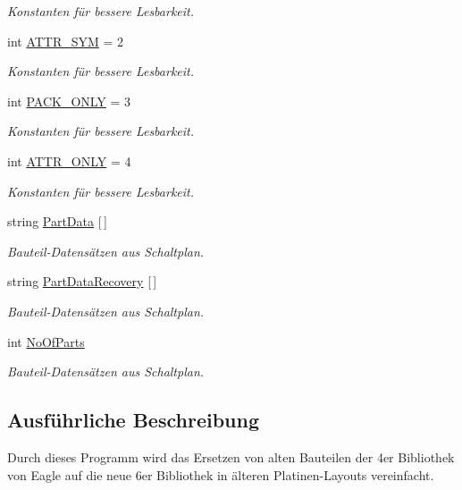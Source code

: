 \begin{DoxyCompactItemize}
\begin{DoxyCompactList}\small\item\em Konstanten für bessere Lesbarkeit. \end{DoxyCompactList}\item 
int \hyperlink{_platzhalter_ersetzen_8ulp_a13a376a84d960a74f079d8654d95ac1c}{A\+T\+T\+R\+\_\+\+S\+Y\+M} = 2
\begin{DoxyCompactList}\small\item\em Konstanten für bessere Lesbarkeit. \end{DoxyCompactList}\item 
int \hyperlink{_platzhalter_ersetzen_8ulp_a70ca181c5a9a77b7c4f1499f2fc6af3e}{P\+A\+C\+K\+\_\+\+O\+N\+L\+Y} = 3
\begin{DoxyCompactList}\small\item\em Konstanten für bessere Lesbarkeit. \end{DoxyCompactList}\item 
int \hyperlink{_platzhalter_ersetzen_8ulp_af88c30c8d185a3f210472a96e11566bd}{A\+T\+T\+R\+\_\+\+O\+N\+L\+Y} = 4
\begin{DoxyCompactList}\small\item\em Konstanten für bessere Lesbarkeit. \end{DoxyCompactList}\item 
string \hyperlink{_platzhalter_ersetzen_8ulp_a73ff9d2da91fa45853c1dea18eb324f2}{Part\+Data} \mbox{[}$\,$\mbox{]}
\begin{DoxyCompactList}\small\item\em Bauteil-\/\+Datensätzen aus Schaltplan. \end{DoxyCompactList}\item 
string \hyperlink{_platzhalter_ersetzen_8ulp_a37c09d8cf4416763821a9df9c26e53e0}{Part\+Data\+Recovery} \mbox{[}$\,$\mbox{]}
\begin{DoxyCompactList}\small\item\em Bauteil-\/\+Datensätzen aus Schaltplan. \end{DoxyCompactList}\item 
int \hyperlink{_platzhalter_ersetzen_8ulp_a92a0e91aab3e1ff3d8857072adcd7c32}{No\+Of\+Parts}
\begin{DoxyCompactList}\small\item\em Bauteil-\/\+Datensätzen aus Schaltplan. \end{DoxyCompactList}\end{DoxyCompactItemize}


\subsection{Ausführliche Beschreibung}
Durch dieses Programm wird das Ersetzen von alten Bauteilen der 4er Bibliothek von Eagle auf die neue 6er Bibliothek in älteren Platinen-\/\+Layouts vereinfacht. 



